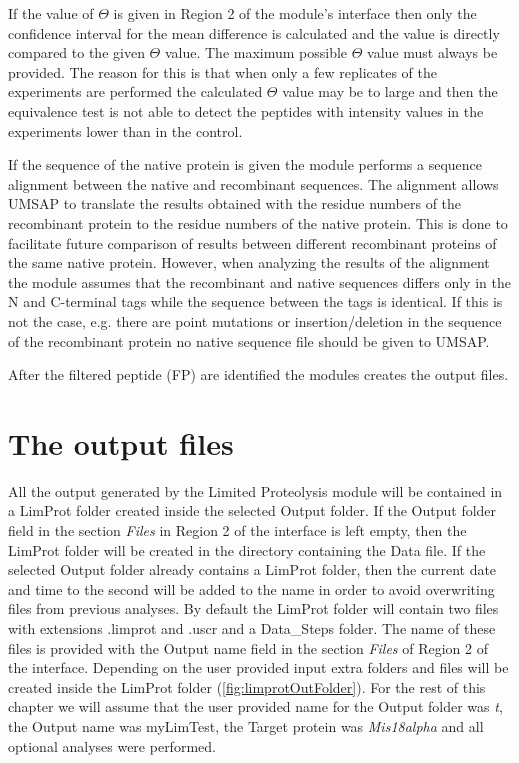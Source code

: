 If the value of $\Theta$ is given in Region \num{2} of the module's interface then only the confidence interval for the mean difference is calculated and the value is directly compared to the given $\Theta$ value. The maximum possible $\Theta$ value must always be provided. The reason for this is that when only a few replicates of the experiments are performed the calculated $\Theta$ value may be to large and then the equivalence test is not able to detect the peptides with intensity values in the experiments lower than in the control.

If the sequence of the native protein is given the module performs a sequence alignment between the native and recombinant sequences. The alignment allows UMSAP to translate the results obtained with the residue numbers of the recombinant protein to the residue numbers of the native protein. This is done to facilitate future comparison of results between different recombinant proteins of the same native protein. However, when analyzing the results of the alignment the module assumes that the recombinant and native sequences differs only in the N and C-terminal tags while the sequence between the tags is identical. If this is not the case, e.g. there are point mutations or insertion/deletion in the sequence of the recombinant protein no native sequence file should be given to UMSAP.

After the filtered peptide (FP) are identified the modules creates the output files.

\section{The output files}

All the output generated by the Limited Proteolysis module will be contained in a LimProt folder created inside the selected Output folder. If the Output folder field in the section \textit{Files} in Region \num{2} of the interface is left empty, then the LimProt folder will be created in the directory containing the Data file. If the selected Output folder already contains a LimProt folder, then the current date and time to the second will be added to the name in order to avoid overwriting files from previous analyses. By default the LimProt folder will contain two files with extensions .limprot and .uscr and a Data{\_}Steps folder. The name of these files is provided with the Output name field in the section \textit{Files} of Region \num{2} of the interface. Depending on the user provided input extra folders and files will be created inside the LimProt folder (\autoref{fig:limprotOutFolder}). For the rest of this chapter we will assume that the user provided name for the Output folder was \textit{t}, the Output name was myLimTest, the Target protein was \textit{Mis18alpha} and all optional analyses were performed.

